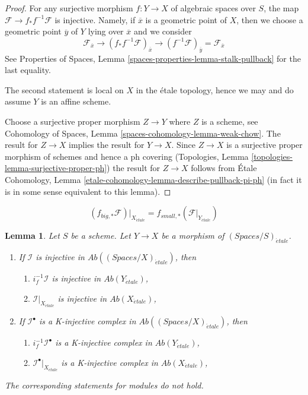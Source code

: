 \documentclass{stacks-project}
\theoremstyle{plain}
\newtheorem{lemma}[subsection]{Lemma}
\theoremstyle{definition}
\theoremstyle{remark}
\numberwithin{equation}{subsection}
\def\etale{{\acute{e}tale}}
\begin{document}
\begin{proof}
For any surjective morphism $f : Y \to X$ of algebraic spaces over $S$,
the map $\mathcal{F} \to f_*f^{-1}\mathcal{F}$ is injective.
Namely, if $\overline{x}$ is a geometric point of $X$, then we
choose a geometric point $\overline{y}$ of $Y$ lying over $\overline{x}$
and we consider
$$
\mathcal{F}_{\overline{x}} \to
(f_*f^{-1}\mathcal{F})_{\overline{x}} \to
(f^{-1}\mathcal{F})_{\overline{y}} = \mathcal{F}_{\overline{x}}
$$
See Properties of Spaces, Lemma \ref{spaces-properties-lemma-stalk-pullback}
for the last equality.

\medskip\noindent
The second statement is local on $X$ in the \'etale topology, hence we may
and do assume $Y$ is an affine scheme.

\medskip\noindent
Choose a surjective proper morphism $Z \to Y$ where $Z$ is a scheme, see
Cohomology of Spaces, Lemma \ref{spaces-cohomology-lemma-weak-chow}.
The result for $Z \to X$ implies the result for $Y \to X$.
Since $Z \to X$ is a surjective proper morphism of schemes
and hence a ph covering
(Topologies, Lemma \ref{topologies-lemma-surjective-proper-ph})
the result for $Z \to X$ follows from
\'Etale Cohomology, Lemma \ref{etale-cohomology-lemma-describe-pullback-pi-ph}
(in fact it is in some sense equivalent to this lemma).
\end{proof}

\begin{equation}
\label{equation-compare-big-small}
(f_{big, *}\mathcal{F})|_{X_\etale} =
f_{small, *}(\mathcal{F}|_{Y_\etale})
\end{equation}

\begin{lemma}
\label{lemma-compare-injectives}
Let $S$ be a scheme.
Let $Y \to X$ be a morphism of $(\textit{Spaces}/S)_\etale$.
\begin{enumerate}
\item If $\mathcal{I}$ is injective in
$\textit{Ab}((\textit{Spaces}/X)_\etale)$, then
\begin{enumerate}
\item $i_f^{-1}\mathcal{I}$ is injective in $\textit{Ab}(Y_\etale)$,
\item $\mathcal{I}|_{X_\etale}$ is injective in $\textit{Ab}(X_\etale)$,
\end{enumerate}
\item If $\mathcal{I}^\bullet$ is a K-injective complex
in $\textit{Ab}((\textit{Spaces}/X)_\etale)$, then
\begin{enumerate}
\item $i_f^{-1}\mathcal{I}^\bullet$ is a K-injective complex in
$\textit{Ab}(Y_\etale)$,
\item $\mathcal{I}^\bullet|_{X_\etale}$ is a K-injective complex in
$\textit{Ab}(X_\etale)$,
\end{enumerate}
\end{enumerate}
The corresponding statements for modules do not hold.
\end{lemma}
\end{document}
